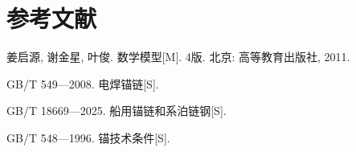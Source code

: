 \section{参考文献}

\noindent [1] 姜启源, 谢金星, 叶俊. 数学模型[M]. 4版. 北京: 高等教育出版社, 2011.

\noindent [2] GB/T 549—2008. 电焊锚链[S].

\noindent [3] GB/T 18669—2025. 船用锚链和系泊链钢[S].

\noindent [4] GB/T 548—1996. 锚技术条件[S].
